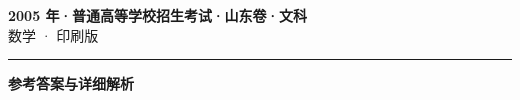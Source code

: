 \documentclass[zihao=5, a4paper]{ctexart}
\begin{document}
\begin{center}
  {\Large\bfseries 2005 年·普通高等学校招生考试·山东卷·文科}\\[4pt]
  {\large 数学 · 印刷版}
\end{center}
\medskip
{}

\par\bigskip\hrule\bigskip
{}
\begin{center}{\large\bfseries 参考答案与详细解析}\end{center}
\smallskip

\end{document}
